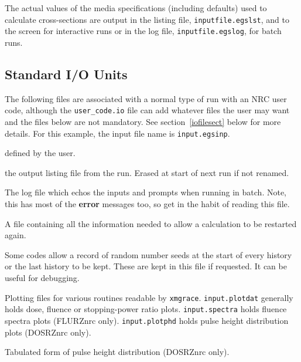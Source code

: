 \documentclass[12pt,twoside]{article}  %
\begin{document}
The actual values of the media specifications (including defaults) used to calculate cross-sections are
output in the listing file, {\tt inputfile.egslst}, and to the screen for interactive runs or in the
log file, {\tt inputfile.egslog}, for batch runs.

\subsection{Standard I/O Units}
\label{iounits}
The following files are associated with a normal type of run with an NRC
user code, although the {\tt user\_code.io} file can add whatever files
the user
may want and the files below are not mandatory.  See section~\ref{iofilesect}
below for more details.  For
this example, the input file name is \verb+input.egsinp+.
\begin{description}

\item [input.egsinp:] defined by the user.

\item [input.egslst:]  the output listing file from the run. Erased
at start of next run if not renamed.

\item [input.egslog:] The log file which echos the inputs and
prompts when running in batch. Note, this has most of the {\bf error}
messages too, so get in the habit of reading this file.

\item [input.egsdat:] A file containing all the information needed to
allow a calculation to be restarted again.

\item [input.egsrns:] Some codes allow a record of random number seeds
at the start of every history or the last history to be kept. These are
kept in this file if requested. It can be useful for debugging.

\item [input.plotdat, input.spectra, input.plotphd:] Plotting files for
various routines readable by \verb+xmgrace+.  {\tt input.plotdat} generally
holds dose, fluence or stopping-power ratio plots. {\tt input.spectra}
holds fluence spectra plots (FLURZnrc only).  {\tt input.plotphd} holds
pulse height distribution plots (DOSRZnrc only).

\item [input.egseff:] Tabulated form of pulse height distribution
(DOSRZnrc only).


\end{description}
\end{document}
